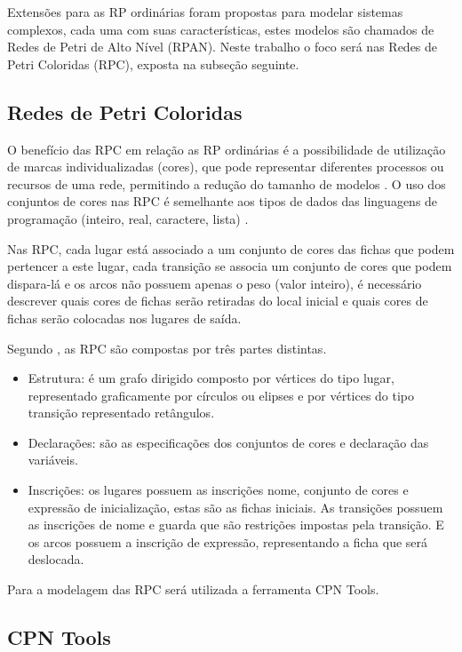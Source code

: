 Extensões para as RP ordinárias foram propostas para modelar sistemas complexos, cada uma com suas características, estes modelos são chamados de Redes de Petri de Alto Nível (RPAN). Neste trabalho o foco será nas Redes de Petri Coloridas (RPC), exposta na subseção seguinte.

\subsection{Redes de Petri Coloridas}

O benefício das RPC em relação as RP ordinárias é a possibilidade de utilização de marcas individualizadas (cores), que pode representar diferentes processos ou recursos de uma rede, permitindo a redução do tamanho de modelos \cite{maciel1996introduccao}. O uso dos conjuntos de cores nas RPC é semelhante aos tipos de dados das linguagens de programação (inteiro, real, caractere, lista) \cite{jensen2013coloured}.

Nas RPC, cada lugar está associado a um conjunto de cores das fichas que podem pertencer a este lugar, cada transição se associa um conjunto de cores que podem dispara-lá e os arcos não possuem apenas o peso (valor inteiro), é necessário descrever quais cores de fichas serão retiradas do local inicial e quais cores de fichas serão colocadas nos lugares de saída.

Segundo \cite{maciel1996introduccao}, as RPC são compostas por três partes distintas.

\begin{itemize}
\item Estrutura: é um grafo dirigido composto por vértices do tipo lugar, representado graficamente por círculos ou elipses e por vértices do tipo transição representado retângulos.
\item Declarações: são as especificações dos conjuntos de cores e declaração das variáveis.
\item Inscrições: os lugares possuem as inscrições nome, conjunto de cores e expressão de inicialização, estas são as fichas iniciais. As transições possuem as inscrições de nome e guarda que são restrições impostas pela transição. E os arcos possuem a inscrição de expressão, representando a ficha que será deslocada.
\end{itemize}

Para a modelagem das RPC será utilizada a ferramenta CPN Tools.

\subsection{CPN Tools}

